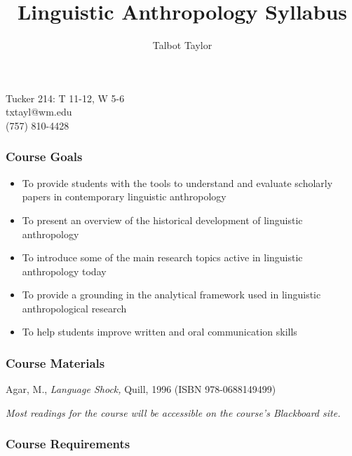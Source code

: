 \documentclass[doc,12pt]{apa6}
\providecommand{\tightlist}{%
  \setlength{\itemsep}{0pt}\setlength{\parskip}{0pt}}
\begin{document}
\title{Linguistic Anthropology Syllabus}
\author{Talbot Taylor}
\date{}
\maketitle

\center
Tucker 214: T 11-12, W 5-6 \\
txtayl@wm.edu \\
(757) 810-4428

\justify

\noindent
\subsubsection{Course Goals}\label{course-goals}

\begin{itemize}
\tightlist
\item
  To provide students with the tools to understand and evaluate
  scholarly papers in contemporary linguistic anthropology
\item
  To present an overview of the historical development of linguistic
  anthropology
\item
  To introduce some of the main research topics active in linguistic
  anthropology today
\item
  To provide a grounding in the analytical framework used in linguistic
  anthropological research
\item
  To help students improve written and oral communication skills
\end{itemize}

\subsubsection{Course Materials}\label{course-materials}

Agar, M., \emph{Language Shock,} Quill, 1996 (ISBN 978-0688149499)

\emph{Most readings for the course will be accessible on the course's
Blackboard site.}

\subsubsection{Course Requirements}\label{course-requirements}
\end{document}

